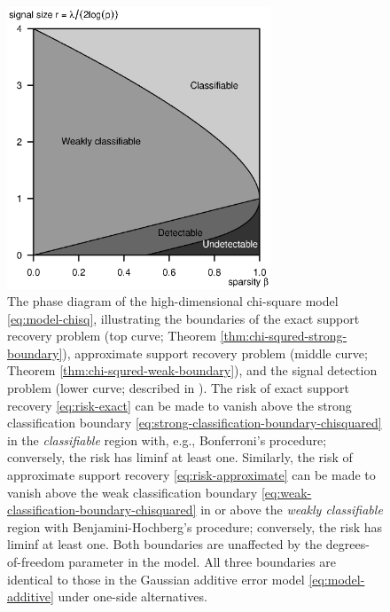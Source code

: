 \begin{figure}
      \centering
      \includegraphics[width=0.7\textwidth]{./phase_diagram_chisquared.eps}
      \caption{The phase diagram of the high-dimensional chi-square model \eqref{eq:model-chisq}, illustrating the boundaries of the exact support recovery problem (top curve; Theorem \ref{thm:chi-squred-strong-boundary}), approximate support recovery problem (middle curve; Theorem \ref{thm:chi-squred-weak-boundary}), and the signal detection problem (lower curve; described in \citep{donoho2004higher}). 
      The risk of exact support recovery \eqref{eq:risk-exact} can be made to vanish above the strong classification boundary \eqref{eq:strong-classification-boundary-chisquared} in the \emph{classifiable} region with, e.g., Bonferroni's procedure; conversely, the risk has liminf at least one.
      Similarly, the risk of approximate support recovery \eqref{eq:risk-approximate} can be made to vanish above the weak classification boundary \eqref{eq:weak-classification-boundary-chisquared} in or above the \emph{weakly classifiable} region with Benjamini-Hochberg's procedure; conversely, the risk has liminf at least one.
      Both boundaries are unaffected by the degrees-of-freedom parameter in the model.
      All three boundaries are identical to those in the Gaussian additive error model \eqref{eq:model-additive} under one-side alternatives.} 
      \label{fig:phase-chi-squared}
\end{figure}


